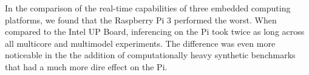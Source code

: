 In the comparison of the real-time capabilities of three embedded computing platforms, we found that 
the Raspberry Pi 3 performed the worst. When compared to the Intel UP Board, inferencing on the Pi 
took twice as long across all multicore and multimodel experiments. The difference was even more 
noticeable in the the addition of computationally heavy synthetic benchmarks that had a much more 
dire effect on the Pi.
